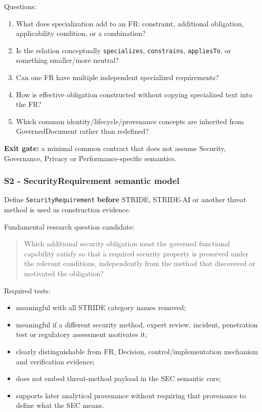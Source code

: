 \documentclass[
  11pt,
  a4paper,
]{article}
\providecommand{\tightlist}{%
  \setlength{\itemsep}{0pt}\setlength{\parskip}{0pt}}
\begin{document}
Questions:

\begin{enumerate}
\def\labelenumi{\arabic{enumi}.}
\tightlist
\item
  What does specialization add to an FR: constraint, additional
  obligation, applicability condition, or a combination?
\item
  Is the relation conceptually \texttt{specializes},
  \texttt{constrains}, \texttt{appliesTo}, or something smaller/more
  neutral?
\item
  Can one FR have multiple independent specialized requirements?
\item
  How is effective obligation constructed without copying specialized
  text into the FR?
\item
  Which common identity/lifecycle/provenance concepts are inherited from
  GovernedDocument rather than redefined?
\end{enumerate}

\textbf{Exit gate:} a minimal common contract that does not assume
Security, Governance, Privacy or Performance-specific semantics.

\subsubsection{S2 - SecurityRequirement semantic
model}\label{s2---securityrequirement-semantic-model}

Define \texttt{SecurityRequirement} \textbf{before} STRIDE, STRIDE-AI or
another threat method is used as construction evidence.

Fundamental research question candidate:

\begin{quote}
Which additional security obligation must the governed functional
capability satisfy so that a required security property is preserved
under the relevant conditions, independently from the method that
discovered or motivated the obligation?
\end{quote}

Required tests:

\begin{itemize}
\tightlist
\item
  meaningful with all STRIDE category names removed;
\item
  meaningful if a different security method, expert review, incident,
  penetration test or regulatory assessment motivates it;
\item
  clearly distinguishable from FR, Decision, control/implementation
  mechanism and verification evidence;
\item
  does not embed threat-method payload in the SEC semantic core;
\item
  supports later analytical provenance without requiring that provenance
  to define what the SEC means.
\end{itemize}
\end{document}
